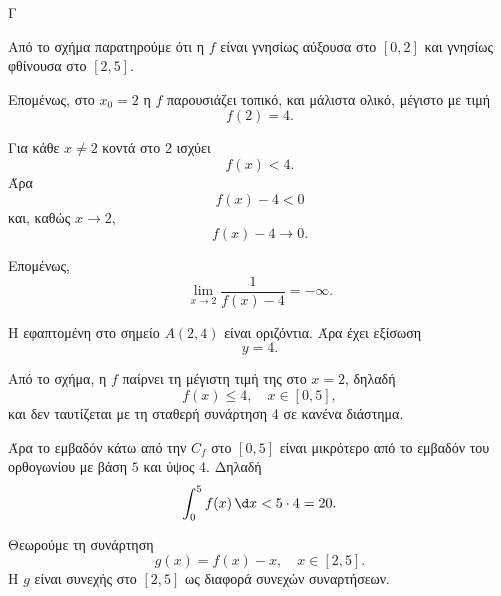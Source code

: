 \begin{thema}{Γ}

\begin{center}
\end{center}

\begin{erwthma}
\item Από το σχήμα παρατηρούμε ότι η $f$ είναι γνησίως αύξουσα στο $[0,2]$ και γνησίως φθίνουσα στο $[2,5]$.

Επομένως, στο $x_0=2$ η $f$ παρουσιάζει τοπικό, και μάλιστα ολικό, μέγιστο με τιμή
\[
f(2)=4.
\]

Για κάθε $x\neq 2$ κοντά στο $2$ ισχύει
\[
f(x)<4.
\]
Άρα
\[
f(x)-4<0
\]
και, καθώς $x\to 2$,
\[
f(x)-4\to 0.
\]

Επομένως,
\[
\lim_{x\to 2}\frac{1}{f(x)-4}=-\infty.
\]

\item Η εφαπτομένη στο σημείο $A(2,4)$ είναι οριζόντια. Άρα έχει εξίσωση
\[
y=4.
\]

Από το σχήμα, η $f$ παίρνει τη μέγιστη τιμή της στο $x=2$, δηλαδή
\[
f(x)\leq 4,\quad x\in[0,5],
\]
και δεν ταυτίζεται με τη σταθερή συνάρτηση $4$ σε κανένα διάστημα.

Άρα το εμβαδόν κάτω από την $C_f$ στο $[0,5]$ είναι μικρότερο από το εμβαδόν του ορθογωνίου με βάση $5$ και ύψος $4$. Δηλαδή
\[
\int_0^5 f(x)\,\d x<5\cdot 4=20.
\]

\item Θεωρούμε τη συνάρτηση
\[
g(x)=f(x)-x,\quad x\in[2,5].
\]
Η $g$ είναι συνεχής στο $[2,5]$ ως διαφορά συνεχών συναρτήσεων.


\end{erwthma}
\end{thema}
